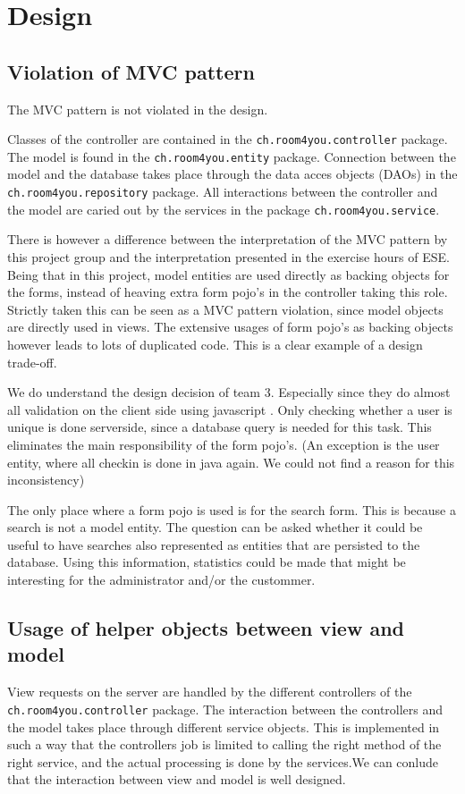 \documentclass[a4wide]{article}
\title{}
\author{}
\begin{document}

\tableofcontents
\clearpage
\section{Design}
\subsection{Violation of MVC pattern}
The MVC pattern is not violated in the design. 

Classes of the controller are contained in the \texttt{ch.room4you.controller} package. The model is found in the \texttt{ch.room4you.entity} package. Connection between the model and the database takes place through the data acces objects (DAOs) in the \texttt{ch.room4you.repository} package. All interactions between the controller and the model are caried out by the services in the package \texttt{ch.room4you.service}.
 
There is however a difference between the interpretation of the MVC pattern by this project group and the interpretation presented in the exercise hours of ESE. Being that in this project, model entities are used directly as backing objects for the forms, instead of heaving extra form pojo's in the controller taking this role. Strictly taken this can be seen as a MVC pattern violation, since model objects are directly used in views. The extensive usages of form pojo's as backing objects however leads to lots of duplicated code. This is a clear example of a design trade-off. 

We do understand the design decision of team 3. Especially since they do almost all validation on the client side using javascript . Only checking whether a user is unique is done serverside, since a database query is needed for this task. This eliminates the main responsibility of the form pojo's. (An exception is the user entity, where all checkin is done in java again. We could not find a reason for this inconsistency)

The only place where a form pojo  is used is for the search form. This is because a search is not a model entity. The question can be asked whether it could be useful to have searches also represented as entities that are persisted to the database. Using this information, statistics could be made that might be interesting for the administrator and/or the custommer. 
\subsection{Usage of helper objects between view and model}
View requests on the server are handled by the different controllers of the \texttt{ch.room4you.controller} package. The interaction between the controllers and the model takes place through different service objects. This is implemented in such a way that the controllers job is limited to calling the right method of the right service, and the actual processing is done by the services.We can conlude that the interaction between view and model is well designed.
\end{document}
